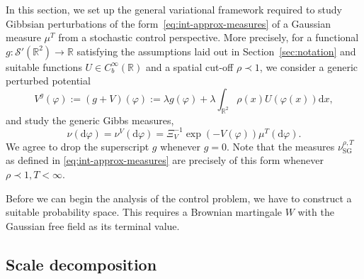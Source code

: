 \documentclass[11pt, a4paper]{scrartcl}
\numberwithin{equation}{section}
\theoremstyle{plain}
\theoremstyle{remark}
\newcommand{\assign}{:=}
\newcommand{\mathd}{\mathrm{d}}
\newcommand{\tmop}[1]{\ensuremath{\operatorname{#1}}}
\begin{document}
In this section, we set up the general variational framework required to study
Gibbsian perturbations of the form~\eqref{eq:int-approx-measures} of a
Gaussian measure $\mu^T$ from a stochastic control perspective. More
precisely, for a functional $g : \mathcal{S}' (\mathbb{R}^2) \rightarrow
\mathbb{R}$ satisfying the assumptions laid out in Section~\ref{sec:notation}
and suitable functions $U \in C^{\infty}_b (\mathbb{R})$ and a spatial cut-off
$\rho \prec 1$, we consider a generic perturbed potential
\begin{equation}
  V^g (\varphi) \assign (g + V) (\varphi) \assign \lambda g (\varphi) +
  \lambda \int_{\mathbb{R}^2} \rho (x) U (\varphi (x)) \mathd x,
  \label{eq:def-Vf}
\end{equation}
and study the generic Gibbs measures,
\begin{equation}
  \nu (\mathd \varphi) = \nu^V (\mathd \varphi) = \Xi_V^{- 1} \exp (- V
  (\varphi)) \mu^T (\mathd \varphi) . \label{eq:nu-general-pot}
\end{equation}
We agree to drop the superscript $g$ whenever $g = 0$. Note that the measures
$\nu_{\tmop{SG}}^{\rho, T}$ as defined in \eqref{eq:int-approx-measures} are
precisely of this form whenever $\rho\prec1, T<\infty$.

Before we can begin the analysis of the control problem, we have to construct
a suitable probability space. This requires a Brownian martingale $W$ with the
Gaussian free field as its terminal value.

\subsection{Scale decomposition}
\end{document}
